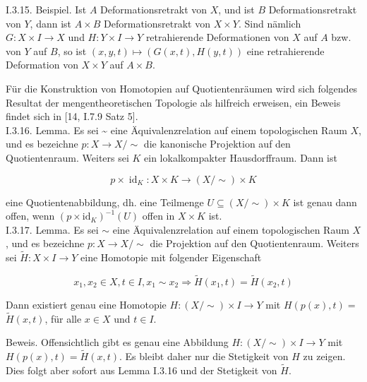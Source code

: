 \documentclass[10pt]{article}
\begin{document}
I.3.15. Beispiel. Ist $A$ Deformationsretrakt von $X$, und ist $B$ Deformationsretrakt von $Y$, dann ist $A \times B$ Deformationsretrakt von $X \times Y$. Sind nämlich $G: X \times I \rightarrow X$ und $H: Y \times I \rightarrow Y$ retrahierende Deformationen von $X$ auf $A$ bzw. von $Y$ auf $B$, so ist $(x, y, t) \mapsto(G(x, t), H(y, t))$ eine retrahierende Deformation von $X \times Y$ auf $A \times B$.

Für die Konstruktion von Homotopien auf Quotientenräumen wird sich folgendes Resultat der mengentheoretischen Topologie als hilfreich erweisen, ein Beweis findet sich in [14, I.7.9 Satz 5].\\
I.3.16. Lemma. Es sei \~{} eine Äquivalenzrelation auf einem topologischen Raum $X$, und es bezeichne $p: X \rightarrow X / \sim$ die kanonische Projektion auf den Quotientenraum. Weiters sei $K$ ein lokalkompakter Hausdorffraum. Dann ist

$$
p \times \operatorname{id}_{K}: X \times K \rightarrow(X / \sim) \times K
$$

eine Quotientenabbildung, dh. eine Teilmenge $U \subseteq(X / \sim) \times K$ ist genau dann offen, wenn $\left(p \times \mathrm{id}_{K}\right)^{-1}(U)$ offen in $X \times K$ ist.\\
I.3.17. Lemma. Es sei $\sim$ eine Äquivalenzrelation auf einem topologischen Raum $X$, und es bezeichne $p: X \rightarrow X / \sim$ die Projektion auf den Quotientenraum. Weiters sei $\tilde{H}: X \times I \rightarrow Y$ eine Homotopie mit folgender Eigenschaft

$$
x_{1}, x_{2} \in X, t \in I, x_{1} \sim x_{2} \Rightarrow \tilde{H}\left(x_{1}, t\right)=\tilde{H}\left(x_{2}, t\right)
$$

Dann existiert genau eine Homotopie $H:(X / \sim) \times I \rightarrow Y$ mit $H(p(x), t)=$ $\tilde{H}(x, t)$, für alle $x \in X$ und $t \in I$.

Beweis. Offensichtlich gibt es genau eine Abbildung $H:(X / \sim) \times I \rightarrow Y$ mit $H(p(x), t)=\tilde{H}(x, t)$. Es bleibt daher nur die Stetigkeit von $H$ zu zeigen. Dies folgt aber sofort aus Lemma I.3.16 und der Stetigkeit von $\tilde{H}$.
\end{document}
